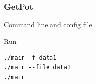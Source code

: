 \documentclass[smaller,a4paper]{beamer}
\begin{document}

\begin{frame}[fragile]

    \frametitle{GetPot}

    \begin{block}{Command line and config file}
        \lstset{basicstyle=\scriptsize\sf}
            
        \lstset{basicstyle=\sf}
    \end{block}

\end{frame}


\begin{frame}[fragile]

    \begin{block}{Run}
        \begin{verbatim}
./main -f data1
./main --file data1
./main
        \end{verbatim}
    \end{block}

\end{frame}
\end{document}
